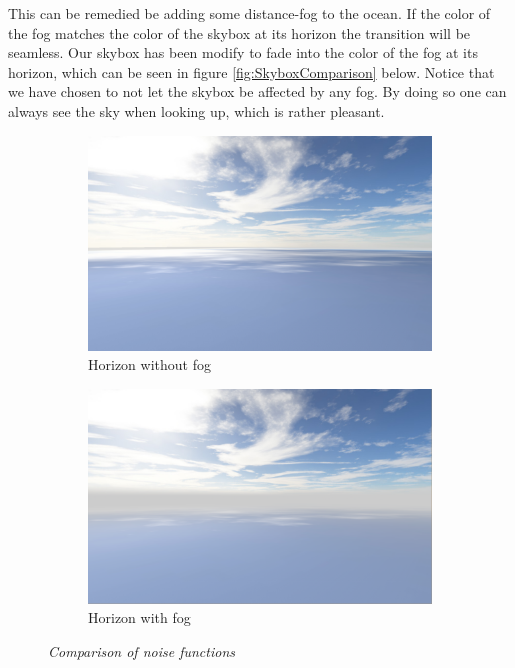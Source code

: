 This can be remedied be adding some distance-fog to the ocean. If the color of the fog matches the color of the skybox at its horizon the transition will be seamless. Our skybox has been modify to fade into the color of the fog at its horizon, which can be seen in figure \ref{fig:SkyboxComparison} below. Notice that we have chosen to not let the skybox be affected by any fog. By doing so one can always see the sky when looking up, which is rather pleasant. 

\begin{figure}[H]
\begin{subfigure}{.5\textwidth}
  \centering
  \includegraphics[width=0.9\linewidth]{images/horizonNoFog.png}
  \caption{Horizon without fog}
  \label{fig:HorizonNoFog}
\end{subfigure}%
\begin{subfigure}{.5\textwidth}
  \centering
  \includegraphics[width=0.9\linewidth]{images/horizonFog.png}
  \caption{Horizon with fog}
  \label{fig:HorizonFog}
\end{subfigure}
\caption[Noise comparison]{\textit{Comparison of noise functions}}
\label{fig:HorizonFogComparison}
\end{figure}

